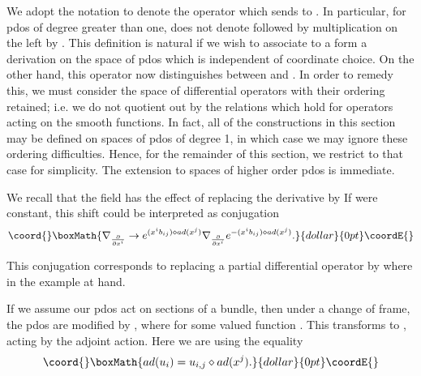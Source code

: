 \documentclass[a4paper,11pt]{amsart}
\begin{document}
We adopt the notation \coordHE{} to denote the operator
which sends \coordHE{} to 
\coordHE{}. In particular, for pdos of degree greater than one, 
\coordHE{} does not denote \coordHE{} followed by multiplication on the
left by \coordHE{}. This definition is natural if we wish to associate to a 
\coordHE{} form \coordHE{} a derivation on the space of pdos which is independent 
of coordinate choice.  On the other hand, this operator now
distinguishes between 
\coordHE{} and 
\coordHE{}. In order to remedy
this, we must consider the space of differential operators with their ordering
 retained; i.e. we do not quotient out by the relations which hold for
 operators acting on the smooth functions. In fact, all of the constructions in
 this section may be defined on spaces of pdos of degree 1, in which case we may
 ignore these ordering difficulties. 
 Hence, for the remainder of this section,  we restrict to that case for
  simplicity. The extension to spaces of higher order pdos is immediate. 
  
 We recall that the \coordHE{} field has the effect of replacing the derivative 
 \coordHE{} by
   \coordHE{}
If \coordHE{} were constant, this shift could be interpreted as conjugation 
$$\coord{}\boxMath{\nabla_{\frac{\partial}{\partial x^i}}\rightarrow 
e^{(x^ib_{ij})\diamond ad(x^j)}\nabla_{\frac{\partial}{\partial
x^i}}e^{-(x^ib_{ij})\diamond ad(x^j)}.}{dollar}{0pt}\coordE{}$$ 

This conjugation corresponds to replacing a partial differential operator 
\coordHE{} by \coordHE{}
where \coordHE{} in the example at hand.  


If we assume our pdos act on sections of a \coordHE{} bundle, then under a change of
frame, the pdos are modified by \coordHE{}, where 
\coordHE{} for some \coordHE{} valued function \coordHE{}. This transforms
\coordHE{} to 
\coordHE{}, \coordHE{} acting by the adjoint
action. Here we are using the equality 
$$\coord{}\boxMath{ad(u_i) = u_{i,j}\diamond ad(x^j).}{dollar}{0pt}\coordE{}$$
\end{document}
